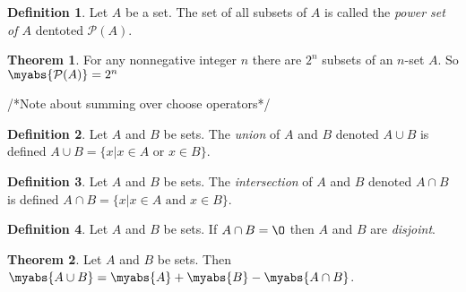 \documentclass[11pt]{article}
\theoremstyle{definition}
\newtheorem{theorem}{Theorem}[section]
\newtheorem{definition}{Definition}[section]
\begin{document}
\begin{definition}
    Let $A$ be a set. The set of all subsets of $A$ is called the \emph{power set of $A$} dentoted $\mathcal{P}(A)$.
\end{definition}
\begin{theorem}
    For any nonnegative integer $n$ there are $2^n$ subsets of an $n$-set $A$. So $\myabs{\mathcal{P}(A)} = 2^n$
\end{theorem}
/*Note about summing over choose operators*/
\begin{definition}
    Let $A$ and $B$ be sets. The \emph{union} of $A$ and $B$ denoted $A \cup B$ is defined $A \cup B = \{ x \vert x \in A \text{ or } x \in B \}$.
\end{definition}
\begin{definition}
    Let $A$ and $B$ be sets. The \emph{intersection} of $A$ and $B$ denoted $A \cap B$ is defined $A \cap B = \{ x \vert x \in A \text{ and } x \in B \}$.
\end{definition}
\begin{definition}
    Let $A$ and $B$ be sets. If $A \cap B = \O$ then $A$ and $B$ are \emph{disjoint}.
\end{definition}
\begin{theorem}
    Let $A$ and $B$ be sets. Then $\myabs{A \cup B} = \myabs{A} + \myabs{B} - \myabs{A \cap B}$.
\end{theorem}
\end{document}
